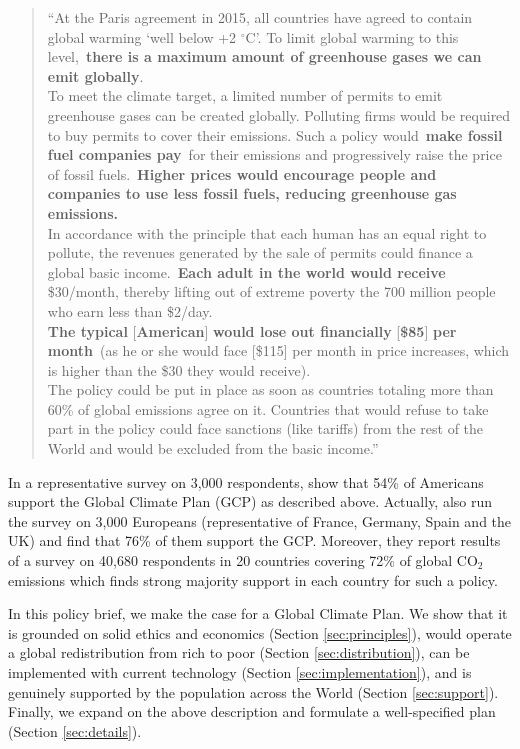 \documentclass[12pt,english]{article}
\begin{document}
\begin{quote}
  ``At the Paris agreement in 2015, all countries have agreed to contain global warming `well below +2 $\mathrm{{}^\circ}$C'. To limit global warming to this level,~\textbf{there is a maximum amount of greenhouse gases we can emit globally}.\\
  To meet the climate target, a limited number of permits to emit greenhouse gases can be created globally. %
  Polluting firms would be required to buy permits to cover their emissions. Such a policy would~\textbf{make fossil fuel companies pay}~for their emissions and progressively raise the price of fossil fuels.~\textbf{Higher prices would encourage people and companies to use less fossil fuels, reducing greenhouse gas emissions.}\\
  In accordance with the principle that each human has an equal right to pollute, the revenues generated by the sale of permits could finance a global basic income.~\textbf{Each adult in the world would receive } \$30/month, thereby lifting out of extreme poverty the 700 million people who earn less than \$2/day.\\
  \textbf{The typical }[\textbf{American}]\textbf{ would lose out financially }[\textbf{\$85}]\textbf{ per month}~(as he or she would face [\$115] per month in price increases, which is higher than the \$30 they would receive).\\
  The policy could be put in place as soon as countries totaling more than 60\% of global emissions agree on it. Countries that would refuse to take part in the policy could face sanctions (like tariffs) from the rest of the World and would be excluded from the basic income.''
\end{quote}

In a representative survey on 3,000 respondents, \citet{fabre_international_2023} show that 54\% of Americans support the Global Climate Plan (GCP) as described above. Actually, \citet{fabre_international_2023} also run the survey on 3,000 Europeans (representative of France, Germany, Spain and the UK) and find that 76\% of them support the GCP. Moreover, they report results of a survey on 40,680 respondents in 20 countries covering 72\% of global CO$_\text{2}$ emissions which finds strong majority support in each country for such a policy.%

In this policy brief, we make the case for a Global Climate Plan. We show that it is grounded on solid ethics and economics (Section \ref{sec:principles}), would operate a global redistribution from rich to poor (Section \ref{sec:distribution}), can be implemented with current technology (Section \ref{sec:implementation}), and is genuinely supported by the population across the World (Section \ref{sec:support}). Finally, we expand on the above description and formulate a well-specified plan (Section \ref{sec:details}).
\end{document}
